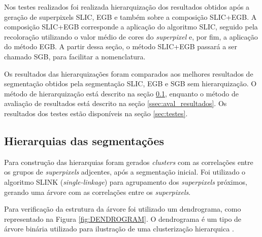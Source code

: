 \begin{document}
Nos testes realizados foi realizada hierarquização dos resultados obtidos após a geração de superpixels SLIC, EGB e também sobre a composição SLIC+EGB. A composição SLIC+EGB corresponde a aplicação do algoritmo SLIC, seguido pela recoloração utilizando o valor médio de cores do \textit{superpixel} e, por fim, a aplicação do método EGB. A partir dessa seção, o método SLIC+EGB passará a ser chamado SGB, para facilitar a nomenclatura.

Os resultados das hierarquizações foram comparados aos melhores resultados de segmentação obtidos pela segmentação SLIC, EGB e SGB sem hierarquização. O método de hierarquização está descrito na seção \ref{ssec:hierquia_segm}, enquanto o método de avaliação de resultados está descrito na seção \ref{ssec:aval_resultados}. Os resultados dos testes estão disponíveis na seção \ref{sec:testes}.


\subsection{Hierarquias das segmentações} \label{ssec:hierquia_segm}


Para construção das hierarquias foram gerados \textit{clusters} com as correlações entre os grupos de \textit{superpixels} adjcentes, após a segmentação inicial. Foi utilizado o algoritmo SLINK (\textit{single-linkage}) para agrupamento dos \textit{superpixels} próximos, gerando uma árvore com as correlações entre os \textit{superpixels}.

Para verificação da estrutura da árvore foi utilizado um dendrograma, como representado na Figura \ref{fig:DENDROGRAM}. O dendrograma é um tipo de árvore binária utilizado para ilustração de uma clusterização hierarquica \cite{SINGLE_LINKAGE}.
\end{document}
